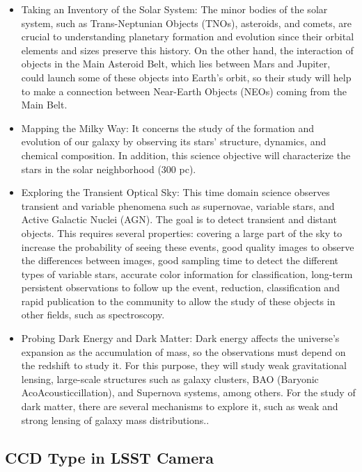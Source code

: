 \begin{itemize}
    \item Taking an Inventory of the Solar System: The minor bodies of the solar system, such as Trans-Neptunian Objects (TNOs), asteroids, and comets, are crucial to understanding planetary formation and evolution since their orbital elements and sizes preserve this history. On the other hand, the interaction of objects in the Main Asteroid Belt, which lies between Mars and Jupiter, could launch some of these objects into Earth's orbit, so their study will help to make a connection between Near-Earth Objects (NEOs) coming from the Main Belt. 
    
    \item Mapping the Milky Way: It concerns the study of the formation and evolution of our galaxy by observing its stars' structure, dynamics, and chemical composition. In addition, this science objective will characterize the stars in the solar neighborhood (300 pc).
    
    \item Exploring the Transient Optical Sky: This time domain science observes transient and variable phenomena such as supernovae, variable stars, and Active Galactic Nuclei (AGN). The goal is to detect transient and distant objects. This requires several properties: covering a large part of the sky to increase the probability of seeing these events, good quality images to observe the differences between images, good sampling time to detect the different types of variable stars, accurate color information for classification, long-term persistent observations to follow up the event, reduction, classification and rapid publication to the community to allow the study of these objects in other fields, such as spectroscopy. 
    
    \item Probing Dark Energy and Dark Matter: Dark energy affects the universe's expansion as the accumulation of mass, so the observations must depend on the redshift to study it. For this purpose, they will study weak gravitational lensing, large-scale structures such as galaxy clusters, BAO (Baryonic AcoAcousticcillation), and Supernova systems, among others. For the study of dark matter, there are several mechanisms to explore it, such as weak and strong lensing of galaxy mass distributions.. 
\end{itemize}

\subsection{CCD Type in LSST Camera}

